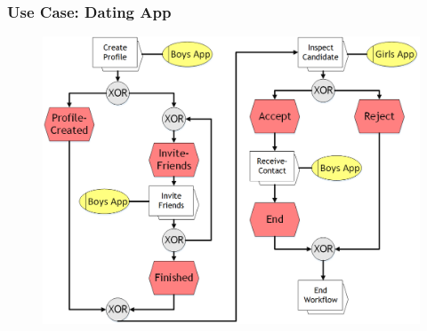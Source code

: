 
\begin{frame}
	\plainnumber
    \frametitle{Use Case: Dating App}
    
    \begin{figure}
    	\includegraphics[width= 0.9\linewidth]{Images/DatingApp.png}
    \end{figure}
\end{frame}
